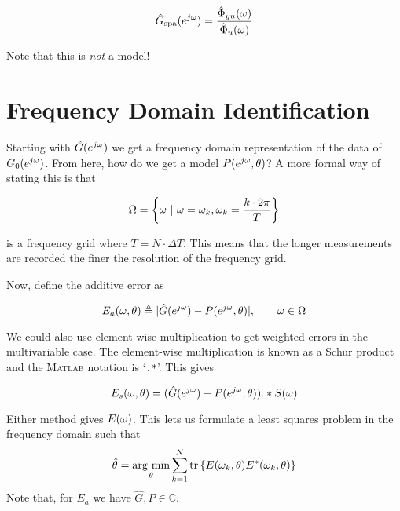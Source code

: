\begin{equation*}
\hat{G}_{\text{spa}}(e^{j\omega}) = \frac{\hat{\Phi}_{yu}(\omega)}{\hat{\Phi}_u(\omega)}
\end{equation*}

Note that this is \textit{not} a model!

\section{Frequency Domain Identification}
Starting with $\hat{G}(e^{j\omega})$ we get a frequency domain representation of the data of $G_0(e^{j\omega})$.
From here, how do we get a model $P(e^{j\omega},\theta)$? A more formal way of stating this is that

\begin{equation*}
\Omega = \left\lbrace \omega~|~\omega=\omega_k, \omega_k=\frac{k\cdot 2\pi}{T} \right\rbrace
\end{equation*}

is a frequency grid where $T=N\cdot\Delta T$.
This means that the longer measurements are recorded the finer the resolution of the frequency grid.

Now, define the additive error as

\begin{equation*}
E_a(\omega,\theta) \triangleq |\hat{G}(e^{j\omega})-P(e^{j\omega},\theta)|, \qquad \omega\in\Omega
\end{equation*}

We could also use element-wise multiplication to get weighted errors in the multivariable case.
The element-wise multiplication is known as a Schur product and the \textsc{Matlab} notation is `\texttt{.*}'.
This gives

\begin{equation*}
E_s(\omega,\theta) = (\hat{G}(e^{j\omega})-P(e^{j\omega},\theta)).*S(\omega)
\end{equation*}

Either method gives $E(\omega)$.
This lets us formulate a least squares problem in the frequency domain such that
\begin{align}
\label{eq:17fls}
\hat{\theta} = \mathop{\arg\,\min}\limits_\theta\sum_{k=1}^N\text{tr}\left\lbrace E(\omega_k,\theta)E^\ast(\omega_k,\theta)\right\rbrace
\end{align}
Note that, for $E_a$ we have $\hat{G},P\in\mathbb{C}$.

